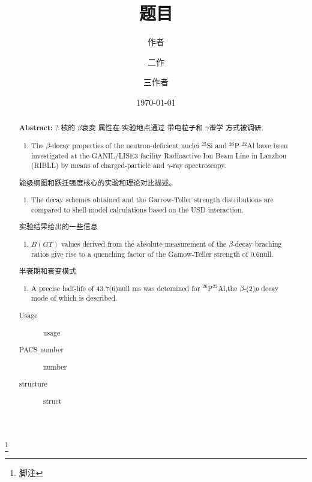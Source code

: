 \documentclass[UTF8]{ctexart}
\begin{document}
\title{题目}
\thanks{脚注}
\author{作者}
\author{二作}   
\author{三作者}
\date{\today}

\begin{abstract}
    \textbf{Abstract:}
    \newline
    {\color{red}?} 核的 {\color{red}$\beta$衰变} 属性在 {\color{red}实验地点}通过 {\color{red}带电粒子和 $\gamma$谱学} 方式被调研.
    \begin{enumerate}
        \item The $\beta$-decay properties of the neutron-deficient nuclei {\color{red}$^{25}$Si and $^{26}$P} {\color{blue}$^{22}$Al} have been investigated at {\color{red}the GANIL/LISE3 facility} {\color{blue}Radioactive Ion Beam Line in Lanzhou (RIBLL)} by means of charged-particle and $\gamma$-ray spectroscopy.
    \end{enumerate}
    {\color{red}能级纲图和跃迁强度核心的实验和理论对比描述。}
    \begin{enumerate}
        \item  The decay schemes obtained and the Garrow-Teller strength distributions are compared to shell-model calculations based on the USD interaction. 
    \end{enumerate}
    {\color{red}实验结果给出的一些信息}
    \begin{enumerate}
        \item $B(GT)$ values derived from the absolute measurement of the $\beta$-decay braching ratios give rise to a quenching factor of the Gamow-Teller strength of {\color{red}0.6}{\color{blue}null}. 
    \end{enumerate}
    {\color{red} 半衰期和衰变模式}
    \begin{enumerate}
        \item A precise half-life of {\color{red}43.7(6)}{\color{blue}null} ms was detemined for {\color{red}$^{26}$P}{\color{blue}$^{22}$Al},the $\beta$-(2)$p$ decay mode of which is described.
    \end{enumerate}
    \begin{description}
        \item[Usage] usage
        \item[PACS number] number
        \item[structure]   struct
    \end{description}

\end{abstract}
\maketitle
\end{document}
